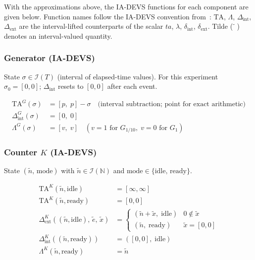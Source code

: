 With the approximations above, the IA-DEVS functions for each component are
given below.  Function names follow the IA-DEVS convention from~\cite{VDW21}:
$\mathrm{TA}$, $\Lambda$, $\Delta_{\text{int}}$, $\Delta_{\text{ext}}$ are
the interval-lifted counterparts of the scalar $ta$, $\lambda$,
$\delta_{\text{int}}$, $\delta_{\text{ext}}$.  Tilde ($\tilde{\phantom{n}}$)
denotes an interval-valued quantity.

\subsubsection*{Generator (IA-DEVS)}

State $\sigma \in \mathcal{I}(T)$ (interval of elapsed-time values).
For this experiment $\sigma_0 = [0,0]$; $\Delta_{\text{int}}$ resets to
$[0,0]$ after each event.

\begin{align*}
  \mathrm{TA}^G(\sigma) &= [p,\; p] - \sigma
    \quad\text{(interval subtraction; point for exact arithmetic)}\\
  \Delta^G_{\text{int}}(\sigma) &= [0,\; 0] \\
  \Lambda^G(\sigma) &= [v,\; v]
    \quad (v=1\text{ for }G_{1/10},\; v=0\text{ for }G_1)
\end{align*}

\subsubsection*{Counter $K$ (IA-DEVS)}

State $(\tilde{n},\, \text{mode})$ with $\tilde{n} \in \mathcal{I}(\mathbb{N})$
and $\text{mode} \in \{\text{idle},\, \text{ready}\}$.

\begin{align*}
  \mathrm{TA}^K(\tilde{n},\text{idle})  &= [\infty, \infty] \\
  \mathrm{TA}^K(\tilde{n},\text{ready}) &= [0, 0] \\
  \Delta^K_{\text{ext}}\!\left((\tilde{n},\text{idle}),\,
      \tilde{e},\, \tilde{x}\right)
    &= \begin{cases}
         (\tilde{n} + \tilde{x},\; \text{idle})  & 0 \notin \tilde{x} \\
         (\tilde{n},\;             \text{ready}) & \tilde{x} = [0,0]
       \end{cases} \\
  \Delta^K_{\text{int}}((\tilde{n},\text{ready}))
    &= ([0,0],\; \text{idle}) \\
  \Lambda^K(\tilde{n},\text{ready})
    &= \tilde{n}
\end{align*}

